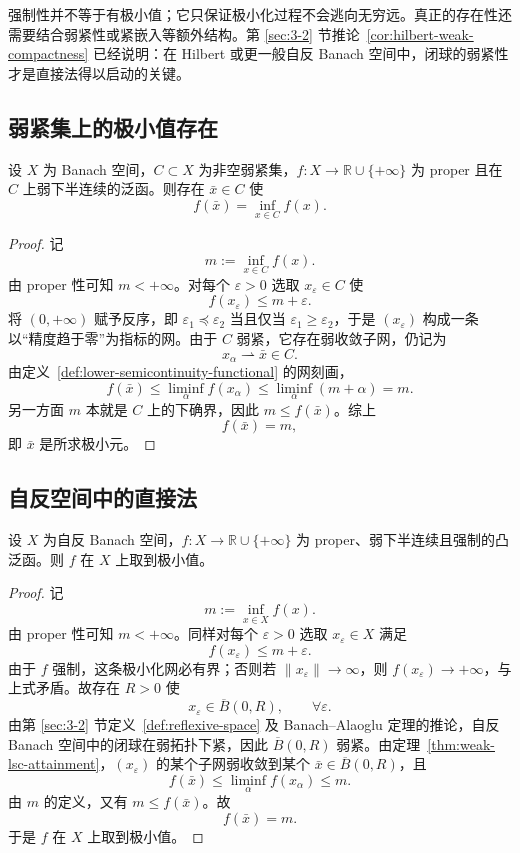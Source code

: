 \begin{remark}
强制性并不等于有极小值；它只保证极小化过程不会逃向无穷远。真正的存在性还需要结合弱紧性或紧嵌入等额外结构。第 \ref{sec:3-2} 节推论~\ref{cor:hilbert-weak-compactness} 已经说明：在 Hilbert 或更一般自反 Banach 空间中，闭球的弱紧性才是直接法得以启动的关键。
\end{remark}

\subsection{弱紧集上的极小值存在}

\begin{theorem}[弱紧集上的弱下半连续泛函取极小值]\label{thm:weak-lsc-attainment}
设 $X$ 为 Banach 空间，$C\subset X$ 为非空弱紧集，$f\colon X\to \mathbb R\cup\{+\infty\}$ 为 proper 且在 $C$ 上弱下半连续的泛函。则存在 $\bar x\in C$ 使
\[
f(\bar x)=\inf_{x\in C}f(x).
\]
\end{theorem}

\begin{proof}
记
\[
m:=\inf_{x\in C}f(x).
\]
由 proper 性可知 $m<+\infty$。对每个 $\varepsilon>0$ 选取 $x_\varepsilon\in C$ 使
\[
f(x_\varepsilon)\le m+\varepsilon.
\]
将 $(0,+\infty)$ 赋予反序，即 $\varepsilon_1\preceq \varepsilon_2$ 当且仅当 $\varepsilon_1\ge \varepsilon_2$，于是 $(x_\varepsilon)$ 构成一条以“精度趋于零”为指标的网。由于 $C$ 弱紧，它存在弱收敛子网，仍记为
\[
x_\alpha \rightharpoonup \bar x\in C.
\]
由定义~\ref{def:lower-semicontinuity-functional} 的网刻画，
\[
f(\bar x)\le \liminf_\alpha f(x_\alpha)\le \liminf_\alpha (m+\alpha)=m.
\]
另一方面 $m$ 本就是 $C$ 上的下确界，因此 $m\le f(\bar x)$。综上
\[
f(\bar x)=m,
\]
即 $\bar x$ 是所求极小元。
\end{proof}

\subsection{自反空间中的直接法}

\begin{theorem}\label{thm:direct-method-reflexive}
设 $X$ 为自反 Banach 空间，$f\colon X\to \mathbb R\cup\{+\infty\}$ 为 proper、弱下半连续且强制的凸泛函。则 $f$ 在 $X$ 上取到极小值。
\end{theorem}

\begin{proof}
记
\[
m:=\inf_{x\in X} f(x).
\]
由 proper 性可知 $m<+\infty$。同样对每个 $\varepsilon>0$ 选取 $x_\varepsilon\in X$ 满足
\[
f(x_\varepsilon)\le m+\varepsilon.
\]
由于 $f$ 强制，这条极小化网必有界；否则若 $\|x_\varepsilon\|\to\infty$，则 $f(x_\varepsilon)\to+\infty$，与上式矛盾。故存在 $R>0$ 使
\[
x_\varepsilon\in \overline{B}(0,R),\qquad \forall \varepsilon.
\]
由第 \ref{sec:3-2} 节定义~\ref{def:reflexive-space} 及 Banach--Alaoglu 定理的推论，自反 Banach 空间中的闭球在弱拓扑下紧，因此 $\overline{B}(0,R)$ 弱紧。由定理~\ref{thm:weak-lsc-attainment}，$(x_\varepsilon)$ 的某个子网弱收敛到某个 $\bar x\in \overline{B}(0,R)$，且
\[
f(\bar x)\le \liminf_\alpha f(x_\alpha)\le m.
\]
由 $m$ 的定义，又有 $m\le f(\bar x)$。故
\[
f(\bar x)=m.
\]
于是 $f$ 在 $X$ 上取到极小值。
\end{proof}

